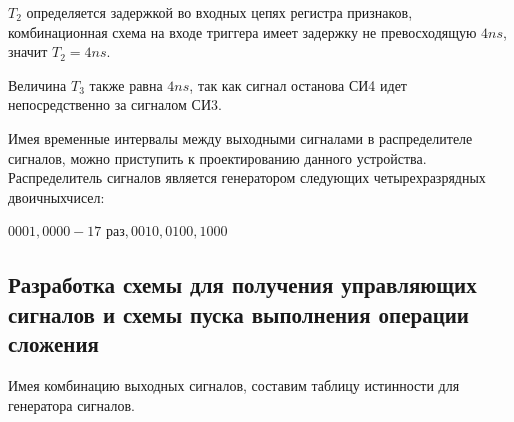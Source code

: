 \documentclass[a4paper,14pt]{article}
\begin{document}
$T_2$ определяется задержкой во входных цепях регистра признаков, комбинационная схема на входе триггера имеет задержку не превосходящую $4ns$, значит $T_2 = 4ns$.

Величина $T_3$ также равна $4ns$, так как сигнал останова СИ4 идет непосредственно за сигналом СИ3.

Имея временные интервалы между выходными сигналами в распределителе сигналов, можно приступить к проектированию данного устройства.
Распределитель сигналов является генератором следующих четырехразрядных двоичныхчисел:

$0001,0000 - 17$ раз$, 0010, 0100, 1000$

\subsection{Разработка схемы для получения управляющих сигналов и схемы пуска выполнения операции сложения}

Имея комбинацию выходных сигналов, составим таблицу истинности для генератора сигналов.
\end{document}
